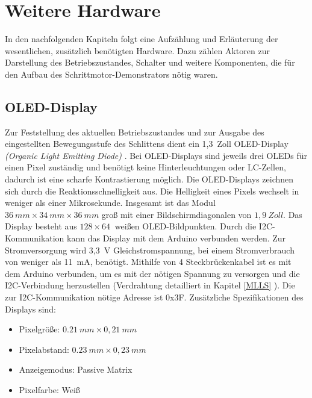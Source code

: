 
\chapter{Weitere Hardware}
In den nachfolgenden Kapiteln folgt eine Aufzählung und Erläuterung der wesentlichen, zusätzlich benötigten Hardware. Dazu zählen Aktoren zur Darstellung des Betriebszustandes, Schalter und weitere Komponenten, die für den Aufbau des Schrittmotor-Demonstrators nötig waren.  

\section{OLED-Display}
Zur Feststellung des aktuellen Betriebszustandes und zur Ausgabe des eingestellten Bewegungsstufe des Schlittens dient ein 1,3\ Zoll OLED-Display \emph{(Organic Light Emitting Diode)} . Bei OLED-Displays sind jeweils drei OLEDs für einen Pixel zuständig und benötigt keine Hinterleuchtungen oder LC-Zellen, dadurch ist eine scharfe Kontrastierung möglich. Die OLED-Displays zeichnen sich durch die Reaktionsschnelligkeit aus. Die Helligkeit eines Pixels wechselt in weniger als einer Mikrosekunde.\cite{DieterStotz.2019} Insgesamt ist das Modul $36 \ mm \times 34  \ mm \times36 \ mm$ groß mit einer Bildschirmdiagonalen von $1,9\ Zoll $. Das Display besteht aus $128 \times 64 \ $ weißen OLED-Bildpunkten. Durch die I2C-Kommunikation kann das Display mit dem Arduino verbunden werden. Zur Stromversorgung wird  3,3\ V Gleichstromspannung, bei einem Stromverbrauch von weniger als 11\ mA, benötigt. Mithilfe von 4 Steckbrückenkabel ist es mit dem Arduino verbunden, um es mit der nötigen Spannung zu versorgen und die I2C-Verbindung herzustellen (Verdrahtung detailliert in Kapitel \ref{MLLS} ). Die zur I2C-Kommunikation nötige Adresse ist 0x3F. %
Zusätzliche Spezifikationen des Displays sind: 
	\begin{itemize}
		\item Pixelgröße: $0.21 \ mm \times 0,21 \ mm $
		\item Pixelabstand: $0.23 \ mm \times 0,23 \ mm $
		\item Anzeigemodus: Passive Matrix
		\item Pixelfarbe: Weiß
	\end{itemize}
\cite{AZDelivery.24}


